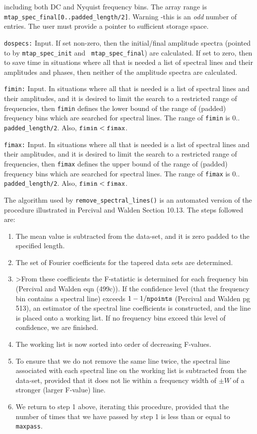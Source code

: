 \begin{description}
  including both DC and Nyquist frequency bins.  The array range is {\tt
  mtap\_spec\_final[0..padded\_length/2]}. Warning -this is an {\it odd}
  number of entries.  The user must provide a pointer to sufficient
  storage space.
\item{\tt dospecs:} Input. If set non-zero, then the initial/final
  amplitude spectra (pointed to by {\tt mtap\_spec\_init} and {\tt
  mtap\_spec\_final}) are calculated.  If set to zero, then to save
  time in situations where all that is needed a list of spectral lines
  and their amplitudes and phases, then neither of the amplitude spectra
  are calculated.
\item{\tt fimin:} Input.  In situations where all that is needed is a list of
  spectral lines and their amplitudes, and it is desired to limit
  the search to a restricted range of frequencies, then {\tt fimin}
  defines the lower bound of the range of (padded) frequency bins which
  are searched for spectral lines.  The range of {\tt fimin} is 0..{\tt
  padded\_length/2}.  Also, ${\tt fimin} < {\tt fimax}$.
\item{\tt fimax:} Input.  In situations where all that is needed is a list of
  spectral lines and their amplitudes, and it is desired to limit
  the search to a restricted range of frequencies, then {\tt fimax}
  defines the upper bound of the range of (padded) frequency bins which
  are searched for spectral lines.  The range of {\tt fimax} is 0..{\tt
  padded\_length/2}.  Also, ${\tt fimin} < {\tt fimax}$.
\end{description}

The algorithm used by {\tt remove\_spectral\_lines()} is an automated
version of the procedure illustrated in Percival and Walden Section 10.13.
The steps followed are:
\begin{enumerate}
\item
The mean value is subtracted from the data-set, and it is zero padded to the
specified length.
\item
The set of Fourier coefficients for the tapered data sets are determined.
\item
>From these coefficients the F-statistic is determined for each frequency
bin (Percival and Walden eqn (499c)).  If the confidence level (that the
frequency bin contains a spectral line) exceeds $1-1/{\tt npoints}$
(Percival and Walden pg 513), an estimator of the spectral line
coefficients is constructed, and the line is placed onto a working list.
If no frequency bins exceed this level of confidence, we are finished.
\item
The working list is now sorted into order of decreasing F-values.
\item
To ensure that we do not remove the same line twice,
the spectral line associated with each spectral line on the working
list is subtracted from the data-set, provided that it does not lie
within a frequency width of $\pm W$ of a stronger (larger F-value) line.
\item 
We return to step 1 above, iterating this procedure, provided that the
number of times that we have passed by step 1 is less than or equal to
{\tt maxpass}.
\end{enumerate}

